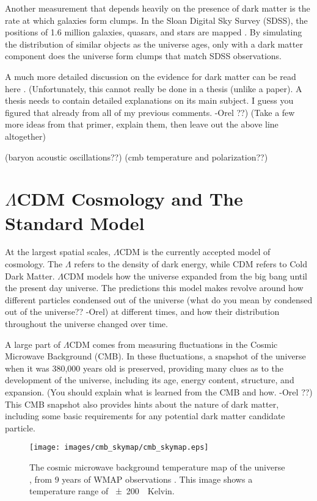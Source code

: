     Another measurement that depends heavily on the presence of dark matter is the rate at which galaxies form clumps.
    In the Sloan Digital Sky Survey (SDSS), the positions of 1.6 million galaxies, quasars, and stars are mapped \cite{sdss_release}.
    By simulating the distribution of similar objects as the universe ages, only with a dark matter component does the universe form clumps that match SDSS observations.
  
    A much more detailed discussion on the evidence for dark matter can be read here \cite{DMPrimer}.
    {\color{red}(Unfortunately, this cannot really be done in a thesis (unlike a paper). A thesis needs to contain detailed explanations on its main subject. I guess you figured that already from all of my previous comments. -Orel ??)}
    {\color{red}(Take a few more ideas from that primer, explain them, then leave out the above line altogether)}

    {\color{red}(baryon acoustic oscillations??)}
    {\color{red}(cmb temperature and polarization??)}

\section{$\Lambda$CDM Cosmology and The Standard Model}

  At the largest spatial scales, $\Lambda$CDM is the currently accepted model of cosmology.
  The $\Lambda$ refers to the density of dark energy, while CDM refers to Cold Dark Matter.
  $\Lambda$CDM models how the universe expanded from the big bang until the present day universe.
  The predictions this model makes revolve around how different particles {\color{red}condensed out of the universe (what do you mean by condensed out of the universe?? -Orel)} at different times, and how their distribution throughout the universe changed over time.

  A large part of $\Lambda$CDM comes from measuring fluctuations in the Cosmic Microwave Background (CMB).
  In these fluctuations, a snapshot of the universe when it was 380,000 years old is preserved, providing many clues as to the development of the universe, including its age, energy content, structure, and expansion. 
  {\color{red}(You should explain what is learned from the CMB and how. -Orel ??)}
  This CMB snapshot also provides hints about the nature of dark matter, including some basic requirements for any potential dark matter candidate particle.

  \begin{figure}[ht]
    \texttt{[image: images/cmb\_skymap/cmb\_skymap.eps]}
    \caption[The Cosmic Microwave Background]{
      The cosmic microwave background temperature map of the universe \cite{wmap_skymap}, from 9 years of WMAP observations \cite{wmap9year}.
      This image shows a temperature range of \SI{\pm200}{\mu{}Kelvin}.
    }
    \label{fig:cmb}
  \end{figure}

